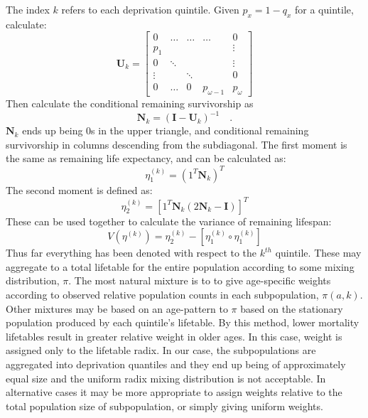 \documentclass[12pt,oneside,a4paper]{article} %
\theoremstyle{definition}
\begin{document}
 The index $k$ refers to each deprivation quintile. Given $p_x = 1- q_x$ for a quintile, calculate:
\begin{equation}
\mathbf{U}_k = 
\begin{bmatrix}
    0     & \hdots  & \hdots &  \hdots  & 0 \\
    p_{1} &   &    &    &  \vdots \\
    0 & \ddots &   &   & \vdots \\
    \vdots & & \ddots & & 0\\
   0 &  \hdots & 0 & p_{\omega-1}  & p_{\omega}
\end{bmatrix}
\end{equation}
Then calculate the conditional remaining survivorship as
\begin{equation}
\mathbf{N}_k = (\mathbf{I} - \mathbf{U}_k )^{-1} \quad .
\end{equation}
$\mathbf{N}_k$ ends up being 0s in the upper triangle, and conditional remaining
survivorship in columns descending from the subdiagonal. The first moment is the
same as remaining life expectancy, and can be calculated as:
\begin{equation}
\eta^{(k)}_1 = (1^T \mathbf{N}_k)^T
\end{equation}
The second moment is defined as:
\begin{equation}
\eta^{(k)}_2 = \left[ 1^T \mathbf{N}_k (2\mathbf{N}_k - \mathbf{I})\right]^T
\end{equation}
These can be used together to calculate the variance of remaining lifespan:
\begin{equation}
\label{eq:var}
V(\eta^{(k)}) = \eta^{(k)}_2 - \left[\eta^{(k)}_1 \circ \eta^{(k)}_1 \right]
\end{equation}
Thus far everything has been denoted with respect to the $k^{th}$ quintile.
These may aggregate to a total lifetable for the entire population according to some mixing distribution,
$\pi$.
The most natural mixture is to to give age-specific weights according to
observed relative population counts in each subpopulation, $\pi(a,k)$. Other
mixtures may be based on an age-pattern to $\pi$ based on the stationary
population produced by each quintile's lifetable. By this method, lower
mortality lifetables result in greater relative weight in older ages. In this
case, weight is assigned only to the lifetable radix. In our case, the subpopulations are aggregated into
deprivation quantiles and they end up being of approximately equal size and the
uniform radix mixing distribution is not acceptable. In alternative cases it may be more appropriate to assign weights relative to the total population size of subpopulation, or simply
giving uniform weights.
\end{document}
